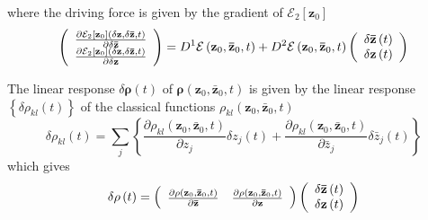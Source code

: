 \documentclass[aps,preprint]{revtex4}%
\begin{document}
where the driving force is given by the gradient of $\mathcal{E}_{2}\left[
\mathbf{z}_{0}\right]  $
\begin{equation}
\left(
\begin{array}
[c]{c}%
\frac{\partial\mathcal{E}_{2}\left[  \mathbf{z}_{0}\right]  \left(
\delta\mathbf{z},\delta\mathbf{\bar{z}},t\right)  }{\partial\delta
\mathbf{\bar{z}}}\\
\frac{\partial\mathcal{E}_{2}\left[  \mathbf{z}_{0}\right]  \left(
\delta\mathbf{z},\delta\mathbf{\bar{z}},t\right)  }{\partial\delta\mathbf{z}}%
\end{array}
\right)  =D^{1}\mathcal{E}\left(  \mathbf{z}_{0},\mathbf{\bar{z}}%
_{0},t\right)  +D^{2}\mathcal{E}\left(  \mathbf{z}_{0},\mathbf{\bar{z}}%
_{0},t\right)  \left(
\begin{array}
[c]{c}%
\delta\mathbf{\bar{z}}\left(  t\right)  \\
\delta\mathbf{z}\left(  t\right)
\end{array}
\right)
\end{equation}


The linear response $\delta\mathbf{\rho}\left(  t\right)  $ of $\mathbf{\rho
}\left(  \mathbf{z}_{0},\mathbf{\bar{z}}_{0},t\right)  $ is given by the
linear response $\left\{  \delta\rho_{kl}\left(  t\right)  \right\}  $ of the
classical functions $\rho_{kl}\left(  \mathbf{z}_{0},\mathbf{\bar{z}}%
_{0},t\right)  $
\begin{equation}
\delta\rho_{kl}\left(  t\right)  =\sum_{j}\left\{  \frac{\partial\rho
_{kl}\left(  \mathbf{z}_{0},\mathbf{\bar{z}}_{0},t\right)  }{\partial z_{j}%
}\delta z_{j}\left(  t\right)  +\frac{\partial\rho_{kl}\left(  \mathbf{z}%
_{0},\mathbf{\bar{z}}_{0},t\right)  }{\partial\bar{z}_{j}}\delta\bar{z}%
_{j}\left(  t\right)  \right\}
\end{equation}
which gives
\begin{equation}
\delta\mathbf{\rho}\left(  t\right)  =\left(
\begin{array}
[c]{cc}%
\frac{\partial\rho\left(  \mathbf{z}_{0},\mathbf{\bar{z}}_{0},t\right)
}{\partial\mathbf{\bar{z}}} & \frac{\partial\rho\left(  \mathbf{z}%
_{0},\mathbf{\bar{z}}_{0},t\right)  }{\partial\mathbf{z}}%
\end{array}
\right)  \left(
\begin{array}
[c]{c}%
\delta\mathbf{\bar{z}}\left(  t\right)  \\
\delta\mathbf{z}\left(  t\right)
\end{array}
\right)
\end{equation}
\end{document}
